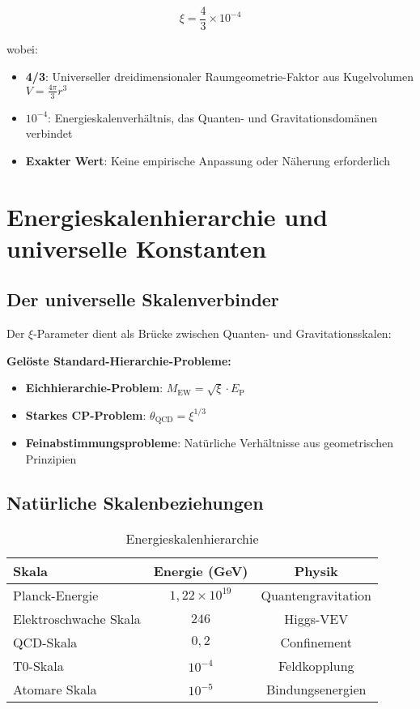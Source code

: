 \documentclass[12pt,a4paper]{report}
\newcommand{\EP}{E_{\text{P}}}            %
\begin{document}
	\begin{equation}
		\xi = \frac{4}{3} \times 10^{-4}
	\end{equation}
	
	wobei:
	\begin{itemize}
		\item \textbf{4/3}: Universeller dreidimensionaler Raumgeometrie-Faktor aus Kugelvolumen $V = \frac{4\pi}{3}r^3$
		\item \textbf{$10^{-4}$}: Energieskalenverhältnis, das Quanten- und Gravitationsdomänen verbindet
		\item \textbf{Exakter Wert}: Keine empirische Anpassung oder Näherung erforderlich
	\end{itemize}
	
	\section{Energieskalenhierarchie und universelle Konstanten}
	\label{sec:energy_scale_hierarchy}
	
	\subsection{Der universelle Skalenverbinder}
	\label{subsec:universal_scale_connector}
	
	Der $\xi$-Parameter dient als Brücke zwischen Quanten- und Gravitationsskalen:
	
	\textbf{Gelöste Standard-Hierarchie-Probleme:}
	\begin{itemize}
		\item \textbf{Eichhierarchie-Problem}: $M_{\text{EW}} = \sqrt{\xi} \cdot \EP$
		\item \textbf{Starkes CP-Problem}: $\theta_{\text{QCD}} = \xi^{1/3}$
		\item \textbf{Feinabstimmungsprobleme}: Natürliche Verhältnisse aus geometrischen Prinzipien
	\end{itemize}
	
	\subsection{Natürliche Skalenbeziehungen}
	\label{subsec:natural_scale_relationships}
	
\begin{table}[htbp]
	\centering
	\begin{tabular}{lcc}
		\toprule
		\textbf{Skala} & \textbf{Energie (GeV)} & \textbf{Physik} \\
		\midrule
		Planck-Energie & $1,22 \times 10^{19}$ & Quantengravitation \\
		Elektroschwache Skala & $246$ & Higgs-VEV \\
		QCD-Skala & $0,2$ & Confinement \\
		T0-Skala & $10^{-4}$ & Feldkopplung \\
		Atomare Skala & $10^{-5}$ & Bindungsenergien \\
		\bottomrule
	\end{tabular}
	\caption{Energieskalenhierarchie}
	\label{tab:energy_scales_no_xi}
\end{table}
\end{document}
